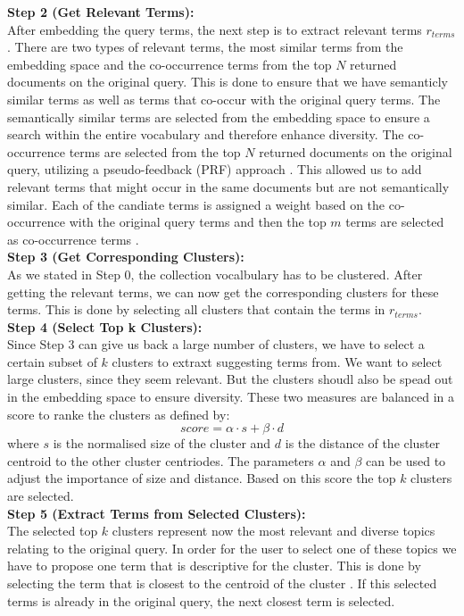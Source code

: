 \textbf{Step 2 (Get Relevant Terms):}\\
After embedding the query terms, the next step is to extract relevant terms $r_{terms}$. There are two types of relevant terms, the most similar terms from the embedding space and the co-occurrence terms from the top $N$ returned documents on the original query. This is done to ensure that we have semanticly similar terms as well as terms that co-occur with the original query terms.
The semantically similar terms are selected from the embedding space to ensure a search within the entire vocabulary and therefore enhance diversity.
The co-occurrence terms are selected from the top $N$ returned documents on the original query, utilizing a pseudo-feedback (PRF) approach \cite{azad2019query}. This allowed us to add relevant terms that might occur in the same documents but are not semantically similar.
Each of the candiate terms is assigned a weight based on the co-occurrence with the original query terms and then the top $m$ terms are selected as co-occurrence terms \cite{azad2019query}.\\

\textbf{Step 3 (Get Corresponding Clusters):}\\
As we stated in Step 0, the collection vocalbulary has to be clustered. After getting the relevant terms, we can now get the corresponding clusters for these terms. This is done by selecting all clusters that contain the terms in $r_{terms}$.\\

\textbf{Step 4 (Select Top k Clusters):}\\
Since Step 3 can give us back a large number of clusters, we have to select a certain subset of $k$ clusters to extraxt suggesting terms from. We want to select large clusters, since they seem relevant. But the clusters shoudl also be spead out in the embedding space to ensure diversity. 
These two measures are balanced in a score to ranke the clusters as defined by: $$score = \alpha \cdot s + \beta \cdot d$$
where $s$ is the normalised size of the cluster and $d$ is the distance of the cluster centroid to the other cluster centriodes. The parameters $\alpha$ and $\beta$ can be used to adjust the importance of size and distance. Based on this score the top $k$ clusters are selected.\\

\textbf{Step 5 (Extract Terms from Selected Clusters):}\\
The selected top $k$ clusters represent now the most relevant and diverse topics relating to the original query. In order for the user to select one of these topics we have to propose one term that is descriptive for the cluster. 
This is done by selecting the term that is closest to the centroid of the cluster \cite{rossiello2017centroid, khennak2019clustering}.
If this selected terms is already in the original query, the next closest term is selected.\\

